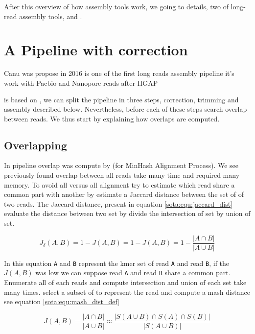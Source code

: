 \documentclass[main]{subfiles}
\begin{document}
After this overview of how \OLC assembly tools work, we going to details, two of long-read \OLC assembly tools, \canu and \miniasm.

\section{A Pipeline with correction \canu} \label{section:sota:canu}

Canu \cite{canu} was propose in 2016 is one of the first long reads assembly pipeline it's work with Pacbio and Nanopore reads after HGAP \cite{hgap}

\canu is based on  \cite{celera_first, celera_second}, we can split the \canu pipeline in three steps, correction, trimming and assembly described below. Nevertheless, before each of these steps \canu search overlap between reads. We thus start by explaining how overlaps are computed.

\subsection{Overlapping} \label{subsec:sota:canu:overlapping}

In \canu pipeline overlap was compute by \mhap (for MinHash Alignment Process). We see previously found overlap between all reads take many time and required many memory. To avoid all versus all alignment \mhap try to estimate which read share a common part with another by estimate a Jaccard distance between the set of \kmers of two reads. The Jaccard distance, present in equation \ref{sota:equ:jaccard_dist} evaluate the distance between two set by divide the intersection of set by union of set.

\begin{equation}
J_{\delta}(A,B) = 1 - J(A,B) = 1 -  J(A,B) = 1 - \frac{|A \cap B|}{|A \cup B|}
\label{sota:equ:jaccard_dist}
\end{equation}

In this equation \texttt{A} and \texttt{B} represent the kmer set of read \texttt{A} and read \texttt{B}, if the $J(A,B)$ was low we can suppose read \texttt{A} and read \texttt{B} share a common part.
Enumerate all \kmers of each reads and compute intersection and union of each set take many times. \mhap select a subset of \kmers to represent the read and compute a mash distance \cite{mash_distance} see equation \ref{sota:equ:mash_dist_def} 

\begin{equation}
J(A,B) = \frac{|A \cap B|}{|A \cup B|} \approx \frac{|S(A \cup B) \cap S(A) \cap S(B)|}{|S(A \cup B)|}
\label{sota:equ:mash_dist_def}
\end{equation}
\end{document}
